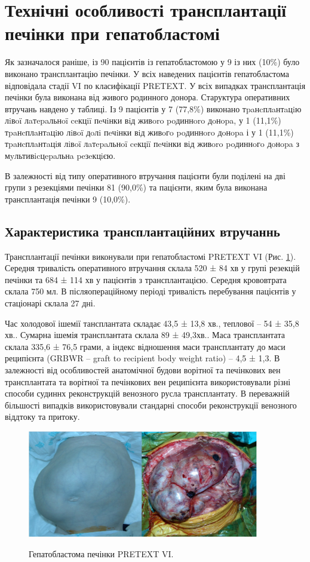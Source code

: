 \section{Технічні особливості трансплантації печінки при гепатобластомі}
Як зазначалося раніше, із 90 пацієнтів із гепатобластомою у 9 із них (10\%) було виконано трансплантацію печінки. 
У всіх наведених пацієнтів гепатобластома відповідала стадії VI по класифікації PRETEXT. У всіх випадках трансплантація печінки була виконана від живого родинного донора. Старуктура оперативних втручань навдено у таблиці. Із 9 пацієнтів у 7	(77,8\%) виконано тpaнcплaнтaцiю лiвoï лaтepaльнoï ceкцiï пeчiнки вiд живoro poдиннoro дoнopa, у	1	(11,1\%) тpaнcплaнтaцiю лiвoï дoлi пeчiнки вiд живoгo poдиннoro дoнopa і у	1	(11,1\%) тpaнcплaнтaцiя лiвoï лaтepaльнoï ceкцiï пeчiнки вiд живoro poдиннoгo дoнopa з мyльтивicцepaльнa peзeкцiєю.

В залежності від типу оперативного втручання пацієнти були поділені на дві групи з резекціями печінки 81 (90,0\%) та пацієнти, яким була виконана трансплантація печінки 9 (10,0\%). 

\subsection{Характеристика трансплантаційних втручаннь}
Трансплантації печінки виконували при гепатобластомі PRETEXT VI (Рис. \ref{fig:foto}). Середня тривалість оперативного втручання склала 520 ± 84 хв у групі резекцій печінки та 684 ± 114 хв у пацієнтів з трансплантацією. Середня крововтрата склала 750 мл. В післяопераційному періоді тривалість перебування пацієнтів у стаціонарі склала 27 дні.

Час холодової ішемії тансплантата складає 43,5 ± 13,8  хв., теплової – 54 ± 35,8  хв.. Сумарна ішемія трансплантата склала 89 ± 49,3хв.. Маса трансплантата склала 335,6 ± 76,5 грами, а індекс відношення маси трансплантату до маси реципієнта (GRBWR – graft to recipient body weight ratio) –  4,5 ± 1,3. 
В залежності від особливостей анатомічної будови ворітної та печінкових вен трансплантата та ворітної та печінкових вен реципієнта використовували різні способи судиннх реконструкцій венозного русла трансплантату. В переважній більшості випадків використовували стандарні способи реконструкції венозного віддтоку та притоку. 

\begin{figure}[h]
\centering
\includegraphics[width=0.9\textwidth]{Illustrations/foto.jpg}
\label{fig:foto} %
\caption{Гепатобластома печінки PRETEXT VI.}
\end{figure} 

